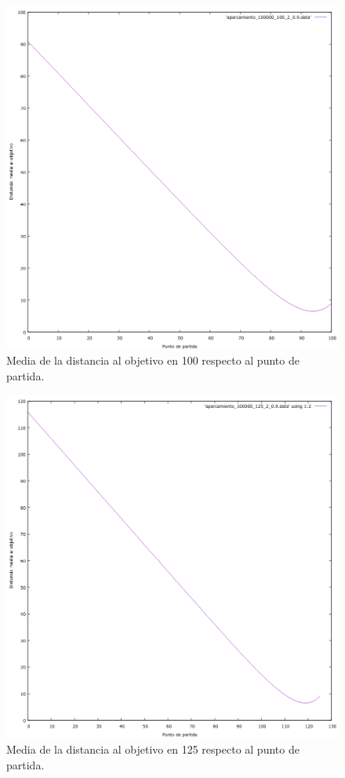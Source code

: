\documentclass[12pt, spanish]{article}
\begin{document}
\begin{figure}[H]
	\centering
	\includegraphics[scale = 0.6]{aparcamiento_100000_100_2_0-9.png}
	\caption{Media de la distancia al objetivo en 100 respecto al punto de partida.}
	\label{fig:ej4}
\end{figure}

\begin{figure}[H]
	\centering
	\includegraphics[scale = 0.6]{aparcamiento_100000_125_2_0-9.png}
	\caption{Media de la distancia al objetivo en 125 respecto al punto de partida.}
	\label{fig:ej4}
\end{figure}
\end{document}

